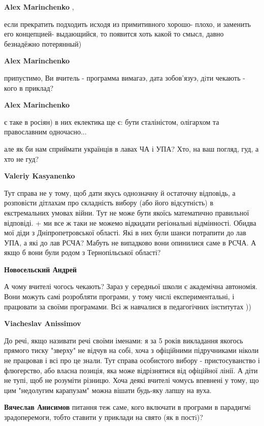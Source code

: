 \begin{itemize}
\begin{itemize}
\textbf{Alex Marinchenko} , 

если прекратить подходить исходя из примитивного хорошо- плохо, и заменить его
концепцией- выдающийся, то появится хоть какой то смысл, давно безнадёжно
потерянный)

\textbf{Alex Marinchenko} 

припустимо, Ви вчитель - программа вимагаэ, дата зобов'язуэ, дiти чекають -
кого в приклад?

\textbf{Alex Marinchenko} 

є таке в росіян) в них еклектика ще є: бути сталіністом, олігархом та
православним одночасно...

але як би нам сприймати українців в лавах ЧА і УПА? Хто, на ваш погляд, гуд, а
хто не гуд?

\textbf{Valeriy Kasyanenko} 

Тут справа не у тому, щоб дати якусь однозначну й остаточну відповідь, а
розповісти дітлахам про складність вибору (або його відсутність) в
екстремальних умовах війни. Тут не може бути якоїсь математично правильної
відповіді. + ми все ж таки не можемо відкидати регіональні відмінності. Обидва
мої діди з Дніпропетровської області. Які в них були шанси потрапити до лав
УПА, а які до лав РСЧА? Мабуть не випадково вони опинилися саме в РСЧА. А якщо
б вони були родом з Тернопільської області?

\textbf{Новосельский Андрей} 

А чому вчителі чогось чекають? Зараз у середньої школи є академічна автономія.
Вони можуть самі розробляти програми, у тому числі експериментальні, і
працювати за своїми програмами. Всі ж навчалися в педагогічних інститутах ))

\textbf{Viacheslav Anissimov} 

До речі, якщо називати речі своїми іменами: я за 5 років викладання якогось
прямого тиску "зверху" не відчув на собі, хоча з офіційними підручниками ніколи
не працював і всі про це знали. Тут справа особистого вибору - пристосуванство
і флюгерство, або власна позиція, яка може відрізнятися від офіційної лінії. А
діти не тупі, щоб не розуміти різницю. Хоча деякі вчителі чомусь впевнені у
тому, що цим "недолугим карапузам" можна вішати будь-яку лапшу на вуха.

\textbf{Вячеслав Анисимов} питання теж саме, кого включати в програми в парадигмi зрадоперемоги, тобто ставити у приклади на свято (як в постi)?


\end{itemize}
\end{itemize}
